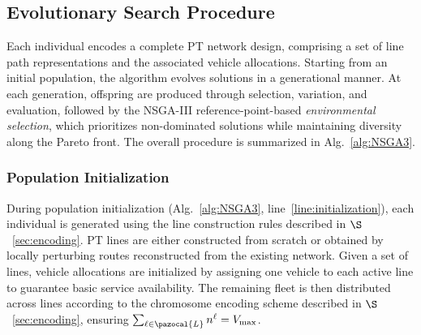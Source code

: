 \documentclass[a4paper,fleqn]{cas-sc}
\begin{document}
\subsection{Evolutionary Search Procedure}
\label{sec:search}

Each individual encodes a complete PT network design, comprising a set of line path representations and the associated vehicle allocations.
Starting from an initial population, the algorithm evolves solutions in a generational manner.
At each generation, offspring are produced through selection, variation, and evaluation, followed by the NSGA-III reference-point-based \textit{environmental selection}, which prioritizes non-dominated solutions while maintaining diversity along the Pareto front.
The overall procedure is summarized in Alg.~\ref{alg:NSGA3}.

\subsubsection{Population Initialization}
\label{sec:init_population}

During population initialization (Alg.~\ref{alg:NSGA3}, line~\ref{line:initialization}),
each individual is generated using the line construction rules described in $\S$~\ref{sec:encoding}.
PT lines are either constructed from scratch or obtained by locally perturbing routes reconstructed from the existing network.
Given a set of lines, vehicle allocations are initialized by assigning one vehicle to each active line to guarantee basic service availability.
The remaining fleet is then distributed across lines according to the chromosome encoding scheme described in $\S$~\ref{sec:encoding}, ensuring $\sum_{\ell \in \pazocal{L}} n^\ell = V_{\max}$.
\end{document}
